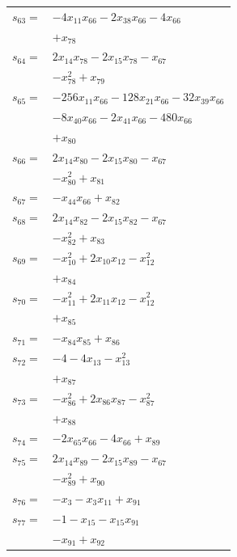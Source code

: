 \begin{longtable}{@{}r@{\;}l@{}}
\(s_{63}=\) & \(\displaystyle -4x_{11}x_{66} -2x_{38}x_{66} -4x_{66}\) \\
 & \(\displaystyle +x_{78}\) \\[3pt]
\(s_{64}=\) & \(\displaystyle 2x_{14}x_{78} -2x_{15}x_{78} -x_{67}\) \\
 & \(\displaystyle -x_{78}^{2} +x_{79}\) \\[3pt]
\(s_{65}=\) & \(\displaystyle -256x_{11}x_{66} -128x_{21}x_{66} -32x_{39}x_{66}\) \\
 & \(\displaystyle -8x_{40}x_{66} -2x_{41}x_{66} -480x_{66}\) \\
 & \(\displaystyle +x_{80}\) \\[3pt]
\(s_{66}=\) & \(\displaystyle 2x_{14}x_{80} -2x_{15}x_{80} -x_{67}\) \\
 & \(\displaystyle -x_{80}^{2} +x_{81}\) \\[3pt]
\(s_{67}=\) & \(\displaystyle -x_{44}x_{66} +x_{82}\) \\[3pt]
\(s_{68}=\) & \(\displaystyle 2x_{14}x_{82} -2x_{15}x_{82} -x_{67}\) \\
 & \(\displaystyle -x_{82}^{2} +x_{83}\) \\[3pt]
\(s_{69}=\) & \(\displaystyle -x_{10}^{2} +2x_{10}x_{12} -x_{12}^{2}\) \\
 & \(\displaystyle +x_{84}\) \\[3pt]
\(s_{70}=\) & \(\displaystyle -x_{11}^{2} +2x_{11}x_{12} -x_{12}^{2}\) \\
 & \(\displaystyle +x_{85}\) \\[3pt]
\(s_{71}=\) & \(\displaystyle -x_{84}x_{85} +x_{86}\) \\[3pt]
\(s_{72}=\) & \(\displaystyle -4 -4x_{13} -x_{13}^{2}\) \\
 & \(\displaystyle +x_{87}\) \\[3pt]
\(s_{73}=\) & \(\displaystyle -x_{86}^{2} +2x_{86}x_{87} -x_{87}^{2}\) \\
 & \(\displaystyle +x_{88}\) \\[3pt]
\(s_{74}=\) & \(\displaystyle -2x_{65}x_{66} -4x_{66} +x_{89}\) \\[3pt]
\(s_{75}=\) & \(\displaystyle 2x_{14}x_{89} -2x_{15}x_{89} -x_{67}\) \\
 & \(\displaystyle -x_{89}^{2} +x_{90}\) \\[3pt]
\(s_{76}=\) & \(\displaystyle -x_{3} -x_{3}x_{11} +x_{91}\) \\[3pt]
\(s_{77}=\) & \(\displaystyle -1 -x_{15} -x_{15}x_{91}\) \\
 & \(\displaystyle -x_{91} +x_{92}\) \\[3pt]

\end{longtable}
